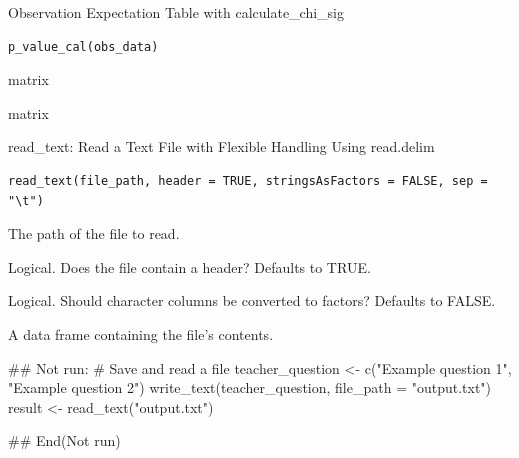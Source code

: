 \documentclass[a4paper]{book}
\begin{document}
%
\begin{Description}
Observation Expectation Table with calculate\_chi\_sig
\end{Description}
%
\begin{Usage}
\begin{verbatim}
p_value_cal(obs_data)
\end{verbatim}
\end{Usage}
%
\begin{Arguments}
\begin{ldescription}
\item[\code{obs\_data}] matrix
\end{ldescription}
\end{Arguments}
%
\begin{Value}
matrix
\end{Value}

%
\begin{Description}
read\_text: Read a Text File with Flexible Handling Using read.delim
\end{Description}
%
\begin{Usage}
\begin{verbatim}
read_text(file_path, header = TRUE, stringsAsFactors = FALSE, sep = "\t")
\end{verbatim}
\end{Usage}
%
\begin{Arguments}
\begin{ldescription}
\item[\code{file\_path}] The path of the file to read.

\item[\code{header}] Logical. Does the file contain a header? Defaults to TRUE.

\item[\code{stringsAsFactors}] Logical. Should character columns be converted to factors? Defaults to FALSE.
\end{ldescription}
\end{Arguments}
%
\begin{Value}
A data frame containing the file's contents.
\end{Value}
%
\begin{Examples}
\begin{ExampleCode}
\#\# Not run: 
# Save and read a file
teacher_question <- c("Example question 1", "Example question 2")
write_text(teacher_question, file_path = "output.txt")
result <- read_text("output.txt")

## End(Not run)

\end{ExampleCode}
\end{Examples}
\end{document}
